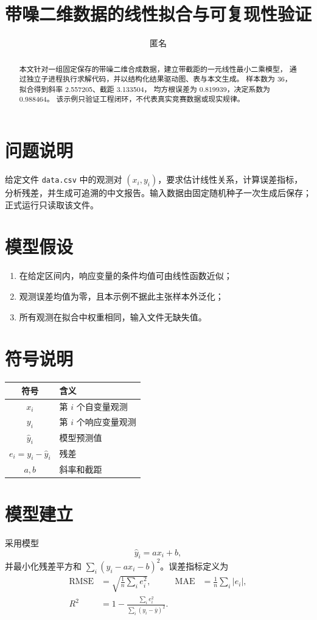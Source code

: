 \documentclass[UTF8,a4paper,11pt]{ctexart}
\title{带噪二维数据的线性拟合与可复现性验证}
\author{匿名}
\date{}
\begin{document}
\maketitle

\begin{abstract}
本文针对一组固定保存的带噪二维合成数据，建立带截距的一元线性最小二乘模型，
通过独立子进程执行求解代码，并以结构化结果驱动图、表与本文生成。
样本数为 36，拟合得到斜率 2.557205、截距 3.133504，
均方根误差为 0.819939，决定系数为 0.988464。
该示例只验证工程闭环，不代表真实竞赛数据或现实规律。
\end{abstract}

\section{问题说明}
给定文件 \texttt{data.csv} 中的观测对 $(x_i,y_i)$，要求估计线性关系，计算误差指标，
分析残差，并生成可追溯的中文报告。输入数据由固定随机种子一次生成后保存；正式运行只读取该文件。

\section{模型假设}
\begin{enumerate}
  \item 在给定区间内，响应变量的条件均值可由线性函数近似；
  \item 观测误差均值为零，且本示例不据此主张样本外泛化；
  \item 所有观测在拟合中权重相同，输入文件无缺失值。
\end{enumerate}

\section{符号说明}
\begin{center}
\begin{tabular}{cl}
\toprule
符号 & 含义 \\
\midrule
$x_i$ & 第 $i$ 个自变量观测 \\
$y_i$ & 第 $i$ 个响应变量观测 \\
$\hat y_i$ & 模型预测值 \\
$e_i=y_i-\hat y_i$ & 残差 \\
$a,b$ & 斜率和截距 \\
\bottomrule
\end{tabular}
\end{center}

\section{模型建立}
采用模型
\begin{equation}
  \hat y_i = a x_i + b,
\end{equation}
并最小化残差平方和 $\sum_i(y_i-a x_i-b)^2$。误差指标定义为
\begin{align}
\mathrm{RMSE} &= \sqrt{\frac1n\sum_i e_i^2}, &
\mathrm{MAE} &= \frac1n\sum_i |e_i|, \\
R^2 &= 1-\frac{\sum_i e_i^2}{\sum_i(y_i-\bar y)^2}.
\end{align}
\end{document}
